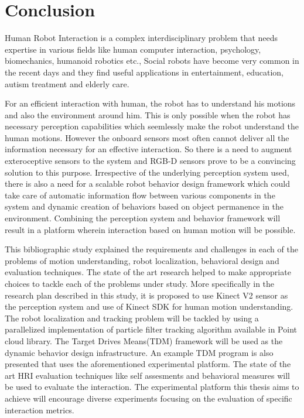 \section{Conclusion} %
	Human Robot Interaction is a complex interdisciplinary problem that needs expertise in various fields like human computer interaction, psychology, biomechanics, humanoid robotics etc., Social robots have become very common in the recent days and they find useful applications in entertainment, education, autism treatment and elderly care. 
	
	For an efficient interaction with human, the robot has to understand his motions and also the environment around him. This is only possible when the robot has necessary perception capabilities which seemlessly make the robot understand the human motions. However the onboard sensors most often cannot deliver all the information necessary for an effective interaction. So there is a need to augment exteroceptive sensors to the system and RGB-D sensors prove to be a convincing solution to this purpose. Irrespective of the underlying perception system used, there is also a need for a scalable robot behavior design framework which could take care of automatic information flow between various components in the system and dynamic creation of behaviors based on object permanence in the environment. Combining the perception system and behavior framework will result in a platform wherein interaction based on human motion will be possible. 
	
	This bibliographic study explained the requirements and challenges in each of the problems of motion understanding, robot localization, behavioral design and evaluation techniques. The state of the art research helped to make appropriate choices to tackle each of the problems under study. More specifically in the research plan described in this study, it is proposed to use Kinect V2 sensor as the perception system and use of Kinect SDK for human motion understanding. The robot localization and tracking problem will be tackled by using a parallelized implementation of particle filter tracking algorithm available in Point cloud library. The Target Drives Means(TDM) framework will be used as the dynamic behavior design infrastructure. An example TDM program is also presented that uses the aforementioned experimental platform. The state of the art HRI evaluation techniques like self assesments and behavioral measures will be used to evaluate the interaction. The experimental platform this thesis aims to achieve will encourage diverse experiments focusing on the evaluation of specific interaction metrics.